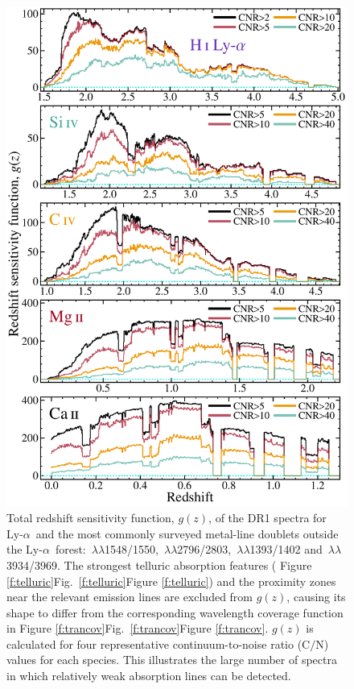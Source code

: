 \documentclass[fleqn,usenatbib,usedcolumn]{mnras}
\newcommand{\Fref}[1]{\ifhmode \ifnum\spacefactor=1001 Figure \ref{#1}\else Fig.\ \ref{#1}\fi \else Figure \ref{#1}\fi}
\newcommand{\CN}{\ensuremath{\textrm{C/N}}}
\newcommand{\lya}{\ensuremath{\textrm{Ly-}\alpha}}
\begin{document}
\begin{figure}
\begin{center}
\includegraphics[width=0.90\columnwidth]{DR1_gz.pdf}
\vspace{-1em}
\caption{Total redshift sensitivity function, $g(z)$, of the DR1 spectra for  \lya\ and the most commonly surveyed metal-line doublets outside the \lya\ forest: \,$\lambda\lambda$1548/1550, \,$\lambda\lambda$2796/2803, \,$\lambda\lambda$1393/1402 and \,$\lambda\lambda$3934/3969. The strongest telluric absorption features (\Fref{f:telluric}) and the proximity zones near the relevant emission lines are excluded from $g(z)$, causing its shape to differ from the corresponding wavelength coverage function in \Fref{f:trancov}. $g(z)$ is calculated for four representative continuum-to-noise ratio (\CN) values for each species. This illustrates the large number of spectra in which relatively weak absorption lines can be detected.}
\label{f:gz}
\end{center}
\end{figure}
\end{document}
